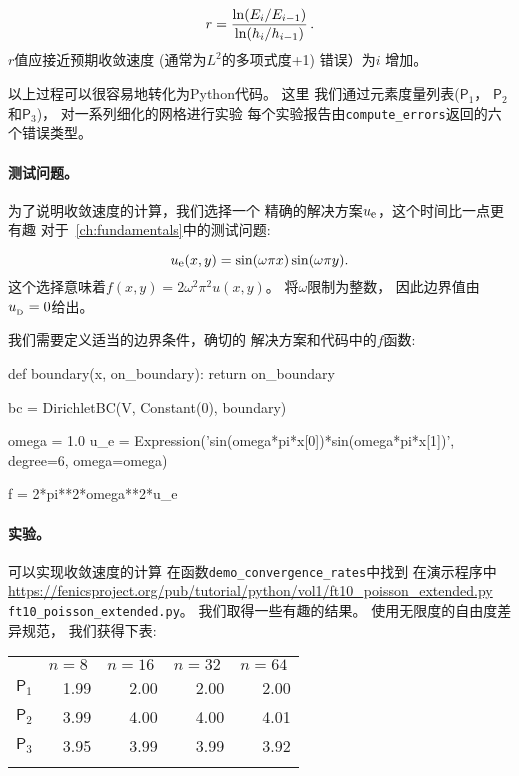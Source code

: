 \begin{equation*}
r = {\ln(E_i/E_{i-1})\over\ln (h_i/h_{i-1})}\tp
\end{equation*}
$r$值应接近预期收敛速度
(通常为$L^2$的多项式度+1)
错误）为$i$
增加。

以上过程可以很容易地转化为Python代码。 这里
我们通过元素度量列表($\mathsf{P}_1$，
$\mathsf{P}_2$和$\mathsf{P}_3$)，
对一系列细化的网格进行实验
每个实验报告由\verb!compute_errors!返回的六个错误类型。

\paragraph{测试问题。}
为了说明收敛速度的计算，我们选择一个
精确的解决方案$\uex$，这个时间比一点更有趣
对于~\ref{ch:fundamentals}中的测试问题:

\begin{equation*}
\uex(x,y) = \sin(\omega\pi x)\sin(\omega\pi y).
\end{equation*}
这个选择意味着$f(x,y)=2\omega^2\pi^2 u(x,y)$。
将$\omega$限制为整数，
因此边界值由$\ub=0$给出。

我们需要定义适当的边界条件，确切的
解决方案和代码中的$f$函数:

\begin{python}
def boundary(x, on_boundary):
    return on_boundary

bc = DirichletBC(V, Constant(0), boundary)

omega = 1.0
u_e = Expression('sin(omega*pi*x[0])*sin(omega*pi*x[1])',
                 degree=6, omega=omega)

f = 2*pi**2*omega**2*u_e
\end{python}

\paragraph{实验。}
可以实现收敛速度的计算
在函数\verb!demo_convergence_rates!中找到 在演示程序中
\url{https://fenicsproject.org/pub/tutorial/python/vol1/ft10_poisson_extended.py} {\nolinkurl{ft10_poisson_extended.py}}。
我们取得一些有趣的结果。
使用无限度的自由度差异规范，
我们获得下表:

{\small

\vspace{4mm}

\begin{tabular}{lrrrr}
\hline\noalign{\smallskip}
\multicolumn{1}{c}{ element } & \multicolumn{1}{c}{ $n=8\ $ } & \multicolumn{1}{c}{ $n=16\ $ } & \multicolumn{1}{c}{ $n=32\ $ } & \multicolumn{1}{c}{ $n=64\ $ } \\
\noalign{\smallskip}\hline\noalign{\smallskip}
$\mathsf{P}_1$ & 1.99    & 2.00     & 2.00     & 2.00     \\
$\mathsf{P}_2$ & 3.99    & 4.00     & 4.00     & 4.01     \\
$\mathsf{P}_3$ & 3.95    & 3.99     & 3.99     & 3.92     \\
\noalign{\smallskip}\hline\noalign{\smallskip}
\end{tabular}

\vspace{4mm}

}

